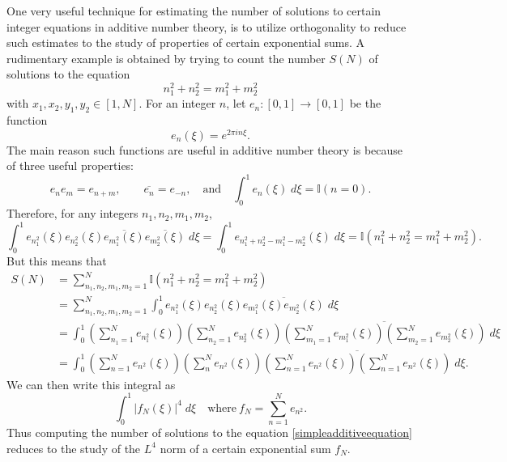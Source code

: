 One very useful technique for estimating the number of solutions to certain integer equations in additive number theory, is to utilize orthogonality to reduce such estimates to the study of properties of certain exponential sums. A rudimentary example is obtained by trying to count the number $S(N)$ of solutions to the equation
%
\begin{equation} \label{simpleadditiveequation}
	n_1^2 + n_2^2 = m_1^2 + m_2^2
\end{equation}
%
with $x_1,x_2,y_1,y_2 \in [1,N]$. For an integer $n$, let $e_n: [0,1] \to [0,1]$ be the function
%
\[ e_n(\xi) = e^{2 \pi i n \xi}. \]
%
The main reason such functions are useful in additive number theory is because of three useful properties:
%
\[ e_n e_m = e_{n+m}, \quad\quad \overline{e_n} = e_{-n}, \quad\text{and}\quad \int_0^1 e_n(\xi)\; d\xi = \mathbb{I}(n = 0). \]
%
Therefore, for any integers $n_1,n_2,m_1,m_2$,
%
\[ \int_0^1 e_{n_1^2}(\xi) e_{n_2^2}(\xi) \overline{e_{m_1^2}(\xi)} \overline{e_{m_2^2}(\xi)}\; d\xi = \int_0^1 e_{n_1^2 + n_2^2 - m_1^2 - m_2^2}(\xi)\; d\xi = \mathbb{I}(n_1^2 + n_2^2 = m_1^2 + m_2^2).  \]
%
But this means that
%
\begin{align*}
	S(N) &= \sum_{n_1,n_2,m_1,m_2 = 1}^N \mathbb{I}(n_1^2 + n_2^2 = m_1^2 + m_2^2)\\
	&= \sum_{n_1,n_2,m_1,m_2 = 1}^N \int_0^1 e_{n_1^2}(\xi) e_{n_2^2}(\xi) \overline{e_{m_1^2}(\xi) e_{m_2^2}(\xi)}\; d\xi\\
	&= \int_0^1 \left( \sum_{n_1 = 1}^N e_{n_1^2}(\xi) \right) \left( \sum_{n_2 = 1}^N e_{n_2^2}(\xi) \right) \overline{\left( \sum_{m_1 = 1}^N e_{m_1^2}(\xi) \right) \left( \sum_{m_2 = 1}^N e_{m_2^2}(\xi) \right)}\; d\xi\\
	&= \int_0^1 \left( \sum_{n = 1}^N e_{n^2}(\xi) \right) \left( \sum_n^N e_{n^2}(\xi) \right) \overline{\left( \sum_{n = 1}^N e_{n^2}(\xi) \right) \left( \sum_{n = 1}^N e_{n^2}(\xi) \right)}\; d\xi.
\end{align*}
%
We can then write this integral as
%
\[ \int_0^1 \left| f_N(\xi) \right|^4\; d\xi \quad\text{where}\ f_N = \sum_{n = 1}^N e_{n^2}. \]
%
Thus computing the number of solutions to the equation \eqref{simpleadditiveequation} reduces to the study of the $L^4$ norm of a certain exponential sum $f_N$.

